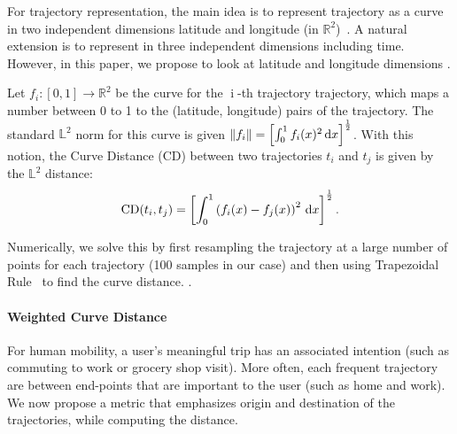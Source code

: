For trajectory representation, the main idea is to represent trajectory as a curve in two independent dimensions latitude and longitude (in $\mathbb{R}^2$)~\cite{Kurtek2012}. A natural extension is to represent in three independent dimensions including time. However, in this paper, we propose to look at latitude and longitude dimensions . 

Let $f_i:[0,1] \rightarrow \mathbb{R}^2$ be the curve for the $\operatorname{i}$-th trajectory trajectory, which maps a number between 0 to 1 to the (latitude, longitude) pairs of the trajectory. The standard $\mathbb{L}^2$ norm for this curve is given $\left\lVert f_i\right\rVert = \left[ \int_{0}^{1}{f_i(x)^2\, \mathrm{d}x }\right] ^ {\frac{1}{2}}$.  With this notion, the Curve Distance (CD) between two trajectories $t_i$ and $t_j$ is given by the $\mathbb{L}^2$ distance:
\begin{align}
\operatorname{CD}(t_i,t_j) = \left[ \int_{0}^{1}{\left(f_i(x) - f_j(x) \right )^2\, \mathrm{d}x }\right] ^ {\frac{1}{2}}.
\end{align}

Numerically, we solve this by first resampling the trajectory at a large number of points for each trajectory (100 samples in our case) and then using Trapezoidal Rule~\cite{trapez} to find the curve distance. .

\paragraph{Weighted Curve Distance} For human mobility, a user's meaningful trip has an associated intention (such as commuting to work or grocery shop visit). More often, each frequent trajectory are between end-points that are important to the user (such as home and work). We now propose a metric that emphasizes origin and destination of the trajectories, while computing the distance. 

